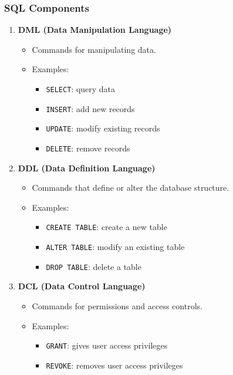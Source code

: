 \documentclass[aspectratio=169]{beamer}
\begin{document}
\begin{frame}[fragile]
    \frametitle{SQL Components}
    \begin{enumerate}
        \item \textbf{DML (Data Manipulation Language)}
            \begin{itemize}
                \item Commands for manipulating data.
                \item Examples:
                \begin{itemize}
                    \item \texttt{SELECT}: query data
                    \item \texttt{INSERT}: add new records
                    \item \texttt{UPDATE}: modify existing records
                    \item \texttt{DELETE}: remove records
                \end{itemize}
            \end{itemize}
        \item \textbf{DDL (Data Definition Language)}
            \begin{itemize}
                \item Commands that define or alter the database structure.
                \item Examples:
                \begin{itemize}
                    \item \texttt{CREATE TABLE}: create a new table
                    \item \texttt{ALTER TABLE}: modify an existing table
                    \item \texttt{DROP TABLE}: delete a table
                \end{itemize}
            \end{itemize}
        \item \textbf{DCL (Data Control Language)}
            \begin{itemize}
                \item Commands for permissions and access controls.
                \item Examples:
                \begin{itemize}
                    \item \texttt{GRANT}: gives user access privileges
                    \item \texttt{REVOKE}: removes user access privileges
                \end{itemize}
            \end{itemize}
    \end{enumerate}
\end{frame}
\end{document}
